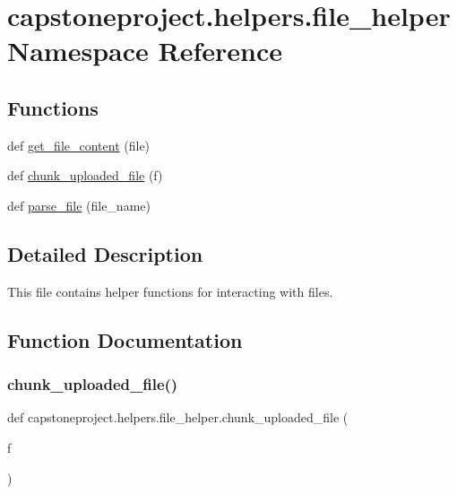 \hypertarget{namespacecapstoneproject_1_1helpers_1_1file__helper}{}\section{capstoneproject.\+helpers.\+file\+\_\+helper Namespace Reference}
\label{namespacecapstoneproject_1_1helpers_1_1file__helper}
\subsection*{Functions}
\begin{DoxyCompactItemize}
\item 
def \mbox{\hyperlink{namespacecapstoneproject_1_1helpers_1_1file__helper_aba707ec8463cda5c19569a87d3becb36}{get\+\_\+file\+\_\+content}} (file)
\item 
def \mbox{\hyperlink{namespacecapstoneproject_1_1helpers_1_1file__helper_a45deda865e5e8c475e447d08f0051d11}{chunk\+\_\+uploaded\+\_\+file}} (f)
\item 
def \mbox{\hyperlink{namespacecapstoneproject_1_1helpers_1_1file__helper_a918cbaf95eec5aae9430d616de3ed087}{parse\+\_\+file}} (file\+\_\+name)
\end{DoxyCompactItemize}


\subsection{Detailed Description}
\begin{DoxyVerb}This file contains helper functions for interacting with files.
\end{DoxyVerb}
 

\subsection{Function Documentation}
\mbox{\label{namespacecapstoneproject_1_1helpers_1_1file__helper_a45deda865e5e8c475e447d08f0051d11}} 
\subsubsection{\texorpdfstring{chunk\+\_\+uploaded\+\_\+file()}{chunk\_uploaded\_file()}}
{\footnotesize\ttfamily def capstoneproject.\+helpers.\+file\+\_\+helper.\+chunk\+\_\+uploaded\+\_\+file (\begin{DoxyParamCaption}\item[{}]{f }\end{DoxyParamCaption})}

